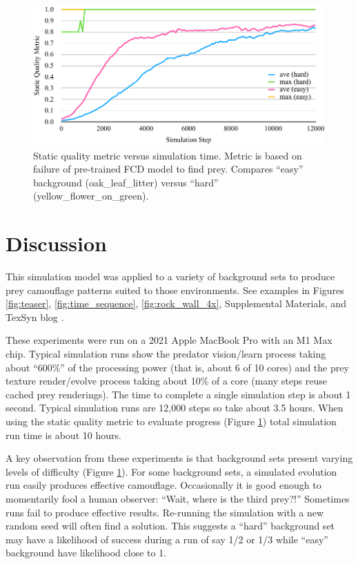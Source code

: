 \documentclass[letterpaper]{article}
\begin{document}

\begin{figure}
    \includegraphics[width=\columnwidth]{SQM_plot_easy_vs_hard.pdf}
    \caption{Static quality metric versus simulation time. Metric is based on failure of pre-trained FCD model to find prey. Compares “easy” background (oak\_leaf\_litter) versus “hard” (yellow\_flower\_on\_green).}
    \label{fig:sqm_plot}
\end{figure}


\section{Discussion}
\label{sec:discussion}
This simulation model was applied to a variety of background sets to produce prey camouflage patterns suited to those environments. See examples in Figures \ref{fig:teaser}, \ref{fig:time_sequence}, \ref{fig:rock_wall_4x}, Supplemental Materials, and TexSyn blog \citep{reynolds_texsyn_blog_2023}.
\par
These experiments were run on a 2021 Apple MacBook Pro with an M1 Max chip. Typical simulation runs show the predator vision/learn process taking about “600\%” of the processing power (that is, about 6 of 10 cores) and the prey texture render/evolve process taking about 10\% of a core (many steps reuse cached prey renderings). The time to complete a single simulation step is about 1 second. Typical simulation runs are 12,000 steps so take about 3.5 hours. When using the static quality metric to evaluate progress (Figure \ref{fig:sqm_plot}) total simulation run time is about 10 hours.
\par
A key observation from these experiments is that background sets present varying levels of difficulty (Figure \ref{fig:sqm_plot}). For some background sets, a simulated evolution run easily produces effective camouflage. Occasionally it is good enough to momentarily fool a human observer: “Wait, where is the third prey?!” Sometimes runs fail to produce effective results. Re-running the simulation with a new random seed will often find a solution. This suggests a “hard” background set may have a likelihood of success during a run of say 1/2 or 1/3 while “easy” background have likelihood close to 1.
\par
\end{document}
